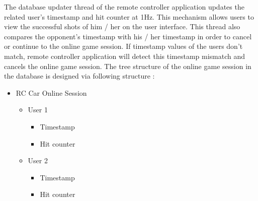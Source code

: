 The database updater thread of the remote controller application updates the related user's timestamp and hit counter at 1Hz. This mechanism allows users to view the successful shots of him / her on the user interface. This thread also compares the opponent's timestamp with his / her timestamp in order to cancel or continue to the online game session. If timestamp values of the users don't match, remote controller application will detect this timestamp mismatch and cancels the online game session. The tree structure of the online game session in the database is designed via following structure :

\begin{itemize}
    \item RC Car Online Session
    \begin{itemize}
        \item User 1
        \begin{itemize}
            \item Timestamp
            \item Hit counter
        \end{itemize}
        \item User 2
        \begin{itemize}
            \item Timestamp
            \item Hit counter
        \end{itemize}
    \end{itemize}
\end{itemize}





